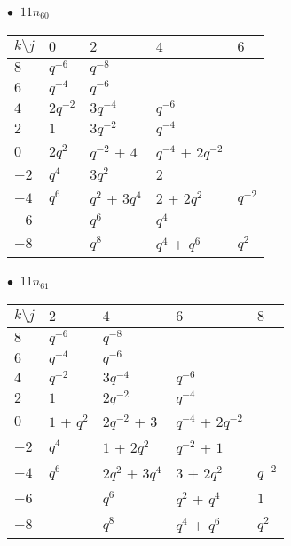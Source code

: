 \begin{minipage}{\linewidth}
$\bullet\ $ $11n_{60}$ \vspace{0.5em} \\
\begin{tabular}{l|llll}
$k \setminus j$ & $0$ & $2$ & $4$ & $6$ \\
\hline
$8$ & $q^{-6}$ & $q^{-8}$ &  &  \\
$6$ & $q^{-4}$ & $q^{-6}$ &  &  \\
$4$ & $2q^{-2}$ & $3q^{-4}$ & $q^{-6}$ &  \\
$2$ & $1$ & $3q^{-2}$ & $q^{-4}$ &  \\
$0$ & $2q^{2}$ & $q^{-2}$ + $4$ & $q^{-4}$ + $2q^{-2}$ &  \\
$-2$ & $q^{4}$ & $3q^{2}$ & $2$ &  \\
$-4$ & $q^{6}$ & $q^{2}$ + $3q^{4}$ & $2$ + $2q^{2}$ & $q^{-2}$ \\
$-6$ &  & $q^{6}$ & $q^{4}$ &  \\
$-8$ &  & $q^{8}$ & $q^{4}$ + $q^{6}$ & $q^{2}$ \\
\end{tabular}
\vspace{2em}
\end{minipage}
%
\begin{minipage}{\linewidth}
$\bullet\ $ $11n_{61}$ \vspace{0.5em} \\
\begin{tabular}{l|llll}
$k \setminus j$ & $2$ & $4$ & $6$ & $8$ \\
\hline
$8$ & $q^{-6}$ & $q^{-8}$ &  &  \\
$6$ & $q^{-4}$ & $q^{-6}$ &  &  \\
$4$ & $q^{-2}$ & $3q^{-4}$ & $q^{-6}$ &  \\
$2$ & $1$ & $2q^{-2}$ & $q^{-4}$ &  \\
$0$ & $1$ + $q^{2}$ & $2q^{-2}$ + $3$ & $q^{-4}$ + $2q^{-2}$ &  \\
$-2$ & $q^{4}$ & $1$ + $2q^{2}$ & $q^{-2}$ + $1$ &  \\
$-4$ & $q^{6}$ & $2q^{2}$ + $3q^{4}$ & $3$ + $2q^{2}$ & $q^{-2}$ \\
$-6$ &  & $q^{6}$ & $q^{2}$ + $q^{4}$ & $1$ \\
$-8$ &  & $q^{8}$ & $q^{4}$ + $q^{6}$ & $q^{2}$ \\
\end{tabular}
\vspace{2em}
\end{minipage}
%
